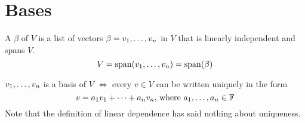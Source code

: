 \section{Bases}

\setcounter{thm}{25}
\begin{mydef} [basis]
  A  $\beta$ of $V$ is a list of vectors $\beta = v_1, \dots, v_n$ in $V$ that is linearly independent and spans $V$.
  \begin{equation}
    V = \operatorname{span} (v_1, \dots, v_n) = \operatorname{span} ( \beta )
  \end{equation}
\end{mydef}

\setcounter{thm}{27}
\begin{thm} 
  $v_1, \dots, v_n$ is a basis of $V$ $\iff$ every $v \in V$ can be written uniquely in the form
  \begin{equation}
    v=a_1 v_1 + \dots + a_n v_n $, where $ a_1, \dots, a_n \in \myF
  \end{equation}
  Note that the definition of linear dependence has said nothing about uniqueness.
\end{thm}


